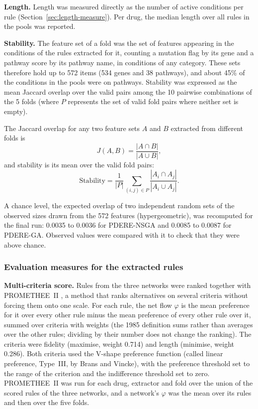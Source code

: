 \textbf{Length.}
Length was measured directly as the number of active conditions per rule (Section~\ref{sec:length-measure}). Per drug, the median length over all rules in the pools was reported.

\textbf{Stability.}
The feature set of a fold was the set of features appearing in the conditions of the rules extracted for it, counting a mutation flag by its gene and a pathway score by its pathway name, in conditions of any category. These sets therefore hold up to 572 items (534 genes and 38 pathways), and about 45\% of the conditions in the pools were on pathways. Stability was expressed as the mean Jaccard overlap over the valid pairs among the 10 pairwise combinations of the 5 folds (where $P$ represents the set of valid fold pairs where neither set is empty).

The Jaccard overlap for any two feature sets $A$ and $B$ extracted from different folds is
\[
  J(A, B) = \frac{|A \cap B|}{|A \cup B|},
\]
and stability is its mean over the valid fold pairs:
\[
  \text{Stability} = \frac{1}{|P|} \sum_{(i,j) \in P} \frac{|A_i \cap A_j|}{|A_i \cup A_j|}.
\]

A chance level, the expected overlap of two independent random sets of the observed sizes drawn from the 572 features (hypergeometric), was recomputed for the final run: 0.0035 to 0.0036 for PDERE-NSGA and 0.0085 to 0.0087 for PDERE-GA. Observed values were compared with it to check that they were above chance.

\subsubsection{Evaluation measures for the extracted rules}
\label{sec:rule-eval}

\textbf{Multi-criteria score.}
Rules from the three networks were ranked together with PROMETHEE~II \citep{brans1985}, a method that ranks alternatives on several criteria without forcing them onto one scale. For each rule, the net flow $\varphi$ is the mean preference for it over every other rule minus the mean preference of every other rule over it, summed over criteria with weights (the 1985 definition sums rather than averages over the other rules; dividing by their number does not change the ranking). The criteria were fidelity (maximise, weight 0.714) and length (minimise, weight 0.286). Both criteria used the V-shape preference function (called linear preference, Type~III, by Brans and Vincke), with the preference threshold set to the range of the criterion and the indifference threshold set to zero. PROMETHEE~II was run for each drug, extractor and fold over the union of the scored rules of the three networks, and a network's $\varphi$ was the mean over its rules and then over the five folds.


